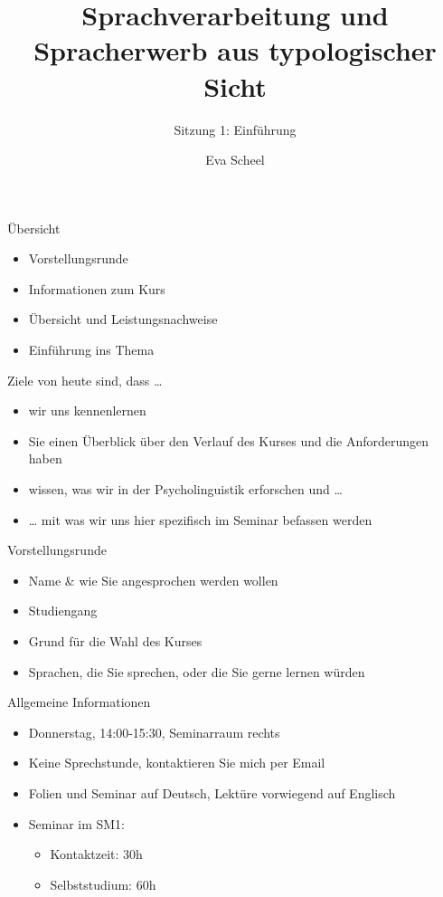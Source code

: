 \documentclass[
  ignorenonframetext,
]{beamer}
\title{Sprachverarbeitung und Spracherwerb aus typologischer Sicht}
\subtitle{Sitzung 1: Einführung}
\author{Eva Scheel}
\date{}
\institute{eva.scheel-huber@uni-koeln.de}
\providecommand{\tightlist}{%
  \setlength{\itemsep}{0pt}\setlength{\parskip}{0pt}}
\begin{document}
\frame{\titlepage}


\begin{frame}
\begin{block}{Übersicht}
\label{uxfcbersicht}
\begin{itemize}
\tightlist
\item
  Vorstellungsrunde
\item
  Informationen zum Kurs
\item
  Übersicht und Leistungsnachweise
\item
  Einführung ins Thema
\end{itemize}
\end{block}

\begin{block}{Ziele von heute sind, dass \ldots{}}
\label{ziele-von-heute-sind-dass}
\begin{itemize}[<+->]
\tightlist
\item
  wir uns kennenlernen
\item
  Sie einen Überblick über den Verlauf des Kurses und die Anforderungen
  haben
\item
  wissen, was wir in der Psycholinguistik erforschen und \ldots{}
\item
  \ldots{} mit was wir uns hier spezifisch im Seminar befassen werden
\end{itemize}
\end{block}

\begin{block}{Vorstellungsrunde}
\label{vorstellungsrunde}
\begin{itemize}
\tightlist
\item
  Name \& wie Sie angesprochen werden wollen
\item
  Studiengang
\item
  Grund für die Wahl des Kurses
\item
  Sprachen, die Sie sprechen, oder die Sie gerne lernen würden
\end{itemize}
\end{block}

\begin{block}{Allgemeine Informationen}
\label{allgemeine-informationen}
\begin{itemize}
\tightlist
\item
  Donnerstag, 14:00-15:30, Seminarraum rechts
\item
  Keine Sprechstunde, kontaktieren Sie mich per Email
\item
  Folien und Seminar auf Deutsch, Lektüre vorwiegend auf Englisch
\item
  Seminar im SM1:

  \begin{itemize}
  \tightlist
  \item
    Kontaktzeit: 30h
  \item
    Selbststudium: 60h
  \end{itemize}
\end{itemize}
\end{block}
\end{frame}
\end{document}

